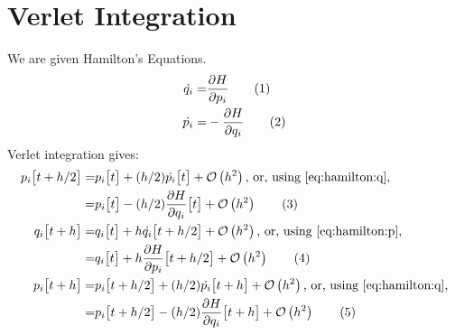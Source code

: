 \documentclass[]{article}
\newcommand\numberthis{\addtocounter{equation}{1}\tag{\theequation}}
\newcommand{\bigO}[1]{\mathcal{O}\left(#1\right)}
\begin{document}
\section{Verlet Integration}
We are given Hamilton's Equations\cite{goldstein1950mechanics}.
\begin{align*}
	\dot{q_i} =& \frac{\partial H}{\partial p_i} \numberthis \label{eq:hamilton:q}\\
	\dot{p_i} =& - \frac{\partial H}{\partial q_i} \numberthis \label{eq:hamilton:p}
\end{align*}
Verlet integration gives\cite{young2014physics}:
\begin{align*}
	p_i\big[t+h/2\big] =& p_i\big[t\big] + (h/2) \dot{p_i}\big[t\big] + \bigO{h^2} \text{, or, using \eqref{eq:hamilton:q},}\\
	=&  p_i\big[t\big] - (h/2) \frac{\partial H}{\partial q_i}\big[t\big] + \bigO{h^2} \numberthis \label{eq:verlet:1}\\
	q_i\big[t+h\big] =&q_i\big[t\big] + h \dot{q_i}\big[t+h/2\big] + \bigO{h^2} \text{, or, using \eqref{eq:hamilton:p},}\\
	=&q_i\big[t\big] + h\frac{\partial H}{\partial p_i}\big[t+h/2\big]+ \bigO{h^2} \numberthis \label{eq:verlet:2}\\
	p_i\big[t+h\big] =&	p_i\big[t+h/2\big] + (h/2) \dot{p_i}\big[t+h\big] + \bigO{h^2} \text{, or, using \eqref{eq:hamilton:q},}\\
	=&	p_i\big[t+h/2\big] - (h/2) \frac{\partial H}{\partial q_i}\big[t+h\big] + \bigO{h^2} \numberthis \label{eq:verlet:3}
\end{align*}


\end{document}
